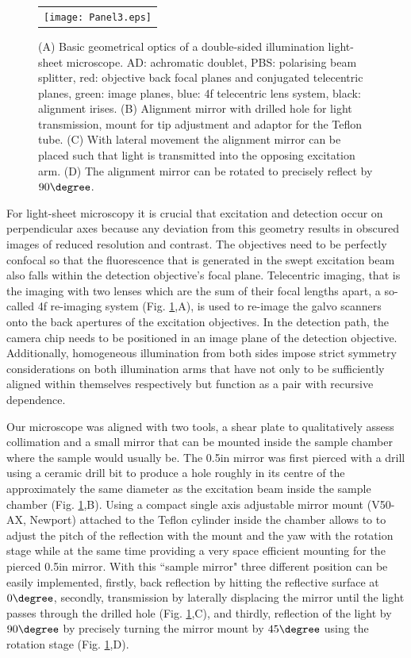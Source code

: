 \documentclass[12pt]{spieman}  %
\begin{document}
\begin{figure}
   \begin{center}
   \begin{tabular}{c}
   \texttt{[image: Panel3.eps]}
   \end{tabular}
   \end{center}
   \caption{\label{fig:alignment} (A) Basic geometrical optics of a double-sided illumination light-sheet microscope. AD: achromatic doublet, PBS: polarising beam splitter, red: objective back focal planes and conjugated telecentric planes, green: image planes, blue: 4f telecentric lens system, black: alignment irises. (B) Alignment mirror with drilled hole for light transmission, mount for tip adjustment and adaptor for the Teflon tube. (C) With lateral movement the alignment mirror can be placed such that light is transmitted into the opposing excitation arm. (D) The alignment mirror can be rotated to precisely reflect by $90\degree$.} 
   \end{figure}

For light-sheet microscopy it is crucial that excitation and detection occur on perpendicular axes because any deviation from this geometry results in obscured images of reduced resolution and contrast. The objectives need to be perfectly confocal so that the fluorescence that is generated in the swept excitation beam also falls within the detection objective's focal plane. Telecentric imaging, that is the imaging with two lenses which are the sum of their focal lengths apart, a so-called 4f re-imaging system (Fig. \ref{fig:alignment},A), is used to re-image the galvo scanners onto the back apertures of the excitation objectives. In the detection path, the camera chip needs to be positioned in an image plane of the detection objective. Additionally, homogeneous illumination from both sides impose strict symmetry considerations on both illumination arms that have not only to be sufficiently aligned within themselves respectively but function as a pair with recursive dependence. 

Our microscope was aligned with two tools, a shear plate to qualitatively assess collimation and a small mirror that can be mounted inside the sample chamber where the sample would usually be. The 0.5in mirror was first pierced with a drill using a ceramic drill bit to produce a hole roughly in its centre of the approximately the same diameter as the excitation beam inside the sample chamber (Fig. \ref{fig:alignment},B). Using a compact single axis adjustable mirror mount (V50-AX, Newport) attached to the Teflon cylinder inside the chamber allows to to adjust the pitch of the reflection with the mount and the yaw with the rotation stage while at the same time providing a very space efficient mounting for the pierced 0.5in mirror. With this ``sample mirror" three different position can be easily implemented, firstly, back reflection by hitting the reflective surface at $0\degree$, secondly, transmission by laterally displacing the mirror until the light passes through the drilled hole (Fig. \ref{fig:alignment},C), and thirdly, reflection of the light by $90\degree$ by precisely turning the mirror mount by $45\degree$ using the rotation stage (Fig. \ref{fig:alignment},D). 
\end{document}

